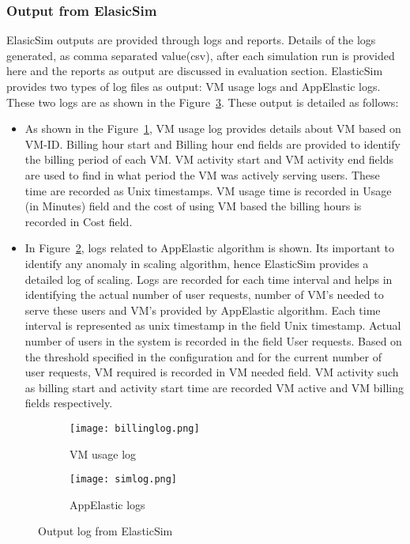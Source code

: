 \subsubsection{Output from ElasicSim}
\label{subs:Output from ElasicSim}
ElasicSim outputs are provided through logs and reports. Details of the logs generated, as comma separated value(csv), after each simulation run is provided here and the reports as output are discussed in evaluation section. ElasticSim provides two types of log files as output: VM usage logs and AppElastic logs. These two logs are as shown in the Figure~\ref{fig:elasticsimlogs}. These output is detailed as follows:
\begin{itemize}
  \item As shown in the Figure~\ref{figure:costlog}, VM usage log provides details about VM based on VM-ID. Billing hour start and Billing hour end fields are provided to identify the billing period of each VM. VM activity start and VM activity end fields are used to find in what period the VM was actively serving users. These time are recorded as Unix timestamps. VM usage time is recorded in Usage (in Minutes) field and the cost of using VM based the billing hours is recorded in Cost field.
  \item In Figure~\ref{figure:appelasticlogs}, logs related to AppElastic algorithm is shown. Its important to identify any anomaly in scaling algorithm, hence ElasticSim provides a detailed log of scaling. Logs are recorded for each time interval and helps in identifying the actual number of user requests, number of VM's needed to serve these users and VM's provided by AppElastic algorithm. Each time interval is represented as unix timestamp in the field Unix timestamp. Actual number of users in the system is recorded in the field User requests. Based on the threshold specified in the configuration and for the current number of user requests, VM required is recorded in VM needed field. VM activity such as billing start and activity start time are recorded VM active and VM billing fields respectively.
\end{itemize}
\begin{figure}
     \centering
     \begin{subfigure}[b]{1.0\textwidth}
         \texttt{[image: billinglog.png]}
         \caption{VM usage log}
         \label{figure:costlog}
     \end{subfigure}
     \begin{subfigure}[b]{0.9\textwidth}
         \texttt{[image: simlog.png]}
         \caption{AppElastic logs}
         \label{figure:appelasticlogs}
     \end{subfigure}
     \caption{Output log from ElasticSim}
     \label{fig:elasticsimlogs}
 \end{figure}
